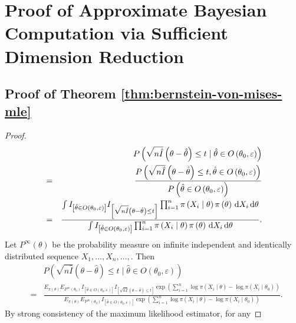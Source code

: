 \chapter{Proof of Approximate Bayesian Computation via Sufficient Dimension
Reduction}


\section{\label{sec:proof-thm-1}Proof of Theorem \ref{thm:bernstein-von-mises-mle}}
\begin{proof}
\begin{eqnarray*}
 &  & P\left(\sqrt{n\hat{I}}\left(\theta-\hat{\theta}\right)\le t\mid\hat{\theta}\in O\left(\theta_{0},\varepsilon\right)\right)\\
 & = & \frac{P\left(\sqrt{n\hat{I}}\left(\theta-\hat{\theta}\right)\le t,\hat{\theta}\in O\left(\theta_{0},\varepsilon\right)\right)}{P\left(\hat{\theta}\in O\left(\theta_{0},\varepsilon\right)\right)}\\
 & = & \frac{\int I_{\left[\hat{\theta}\in O\left(\theta_{0},\varepsilon\right)\right]}I_{\left[\sqrt{n\hat{I}}\left(\theta-\hat{\theta}\right)\le t\right]}\prod_{i=1}^{n}\pi\left(X_{i}\mid\theta\right)\pi\left(\theta\right)\,\mathrm{d} X_{i}\,\mathrm{d}\theta}{\int I_{\left[\hat{\theta}\in O\left(\theta_{0},\varepsilon\right)\right]}\prod_{i=1}^{n}\pi\left(X_{i}\mid\theta\right)\pi\left(\theta\right)\,\mathrm{d} X_{i}\,\mathrm{d}\theta}.
\end{eqnarray*}
Let $P^{\infty}\left(\theta\right)$ be the probability measure on
infinite independent and identically distributed sequence $X_{1},\ldots,X_{n},\ldots,$.
Then 
\begin{eqnarray}
 &  & P\left(\sqrt{n\hat{I}}\left(\theta-\hat{\theta}\right)\le t\mid\hat{\theta}\in O\left(\theta_{0},\varepsilon\right)\right)\nonumber \\
 & = & \frac{E_{\pi\left(\theta\right)}E_{P^{\infty}\left(\theta_{0}\right)}I_{\left[\hat{\theta}\in O\left(\theta_{0},\varepsilon\right)\right]}I_{\left[\sqrt{n\hat{I}}\left(\theta-\hat{\theta}\right)\le t\right]}\exp\left(\sum_{i=1}^{n}\log\pi\left(X_{i}\mid\theta\right)-\log\pi\left(X_{i}\mid\theta_{0}\right)\right)}{E_{\pi\left(\theta\right)}E_{P^{\infty}\left(\theta_{0}\right)}I_{\left[\hat{\theta}\in O\left(\theta_{0},\varepsilon\right)\right]}\exp\left(\sum_{i=1}^{n}\log\pi\left(X_{i}\mid\theta\right)-\log\pi\left(X_{i}\mid\theta_{0}\right)\right)}.\label{eq:post-change-measure}
\end{eqnarray}
By strong consistency of the maximum likelihood estimator, for any

\end{proof}

